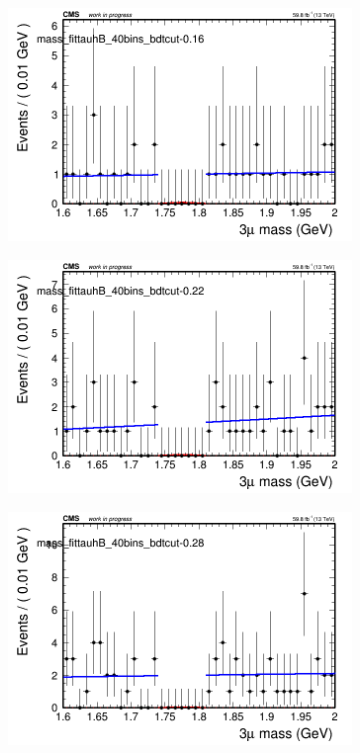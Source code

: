 \begin{figure}[H]
\begin{subfigure}{0.2\textwidth}
        \includegraphics[width=\textwidth]{power_law/plots/tauhB/massfit_tauhB_40bins_bdtcut-0.16.png}
        \caption{}
    \end{subfigure}
    \begin{subfigure}{0.2\textwidth}
        \includegraphics[width=\textwidth]{power_law/plots/tauhB/massfit_tauhB_40bins_bdtcut-0.22.png}
        \caption{}
    \end{subfigure}
    \begin{subfigure}{0.2\textwidth}
        \includegraphics[width=\textwidth]{power_law/plots/tauhB/massfit_tauhB_40bins_bdtcut-0.28.png}

\end{subfigure}
\end{figure}
